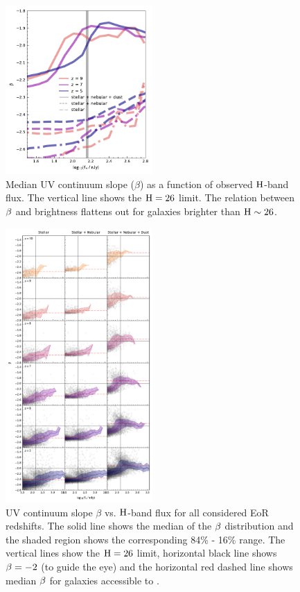 \begin{figure}
	\centering
	\includegraphics[width=0.5\textwidth]{./figures/beta/beta_summary.pdf}
	\caption{Median UV continuum slope ($\beta$) as a function of observed $\rm H$-band flux. The vertical line shows the $\rm H = 26$ limit. The relation between $\rm \beta$ and brightness flattens out for galaxies brighter than $\rm H \sim 26$. \label{fig:beta_summary}}
\end{figure}


\begin{figure}
	\centering
	\includegraphics[width=0.5\textwidth]{./figures/beta/beta_all}
	\caption{UV continuum slope $\beta$ vs. $\rm H$-band flux for all considered EoR redshifts. The solid line shows the median of the $\rm \beta$ distribution and the shaded region shows the corresponding 84\% - 16\% range. The vertical lines show the $\rm H = 26$ limit, horizontal black line shows $\rm \beta = -2$ (to guide the eye) and the horizontal red dashed line shows median $\rm \beta$ for galaxies accessible to \euclid. \label{fig:beta_all}}
\end{figure}